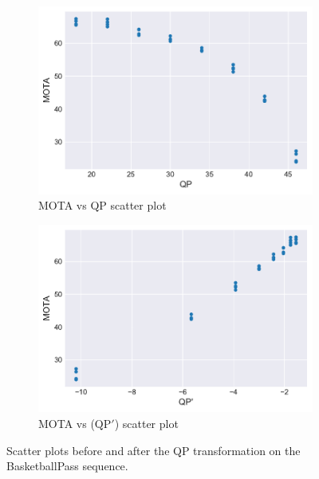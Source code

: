 
\begin{figure}[!tb]
  \centering
  \begin{subfigure}[b]{.5\textwidth}
    \includegraphics[width=\textwidth]{img/QP_transformation_before.pdf}
    \caption{MOTA vs QP scatter plot}
    \label{fig:QP_transformation_before}
  \end{subfigure}%
  \begin{subfigure}[b]{.5\textwidth}
    \includegraphics[width=\textwidth]{img/QP_transformation_after.pdf}
    \caption{MOTA vs ($\text{QP}'$) scatter plot}
    \label{fig:QP_transformation_after}
  \end{subfigure}
  \caption[Scatter plots before and after the QP transformation on the BasketballPass sequence]{%
    Scatter plots before and after the QP transformation on the BasketballPass sequence.%
  }
  \label{fig:QP_transformation}
\end{figure}
